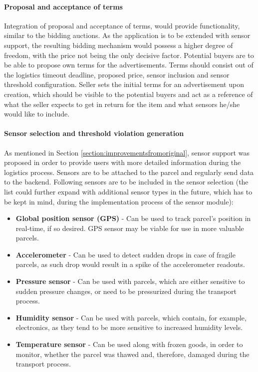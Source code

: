 \paragraph{Proposal and acceptance of terms}
Integration of proposal and acceptance of terms, would provide functionality, similar to the bidding auctions. As the application is to be extended with sensor support, the resulting bidding mechanism would possess a higher degree of freedom, with the price not being the only decisive factor. Potential buyers are to be able to propose own terms for the advertisements. Terms should consist out of the logistics timeout deadline, proposed price, sensor inclusion and sensor threshold configuration. Seller sets the initial terms for an advertisement upon creation, which should be visible to the potential buyers and act as a reference of what the seller expects to get in return for the item and what sensors he/she would like to include.

\paragraph{Sensor selection and threshold violation generation}
As mentioned in Section \ref{section:improvementsfromoriginal}, sensor support was proposed in order to provide users with more detailed information during the logistics process. Sensors are to be attached to the parcel and regularly send data to the backend. Following sensors are to be included in the sensor selection (the list could further expand with additional sensor types in the future, which has to be kept in mind, during the implementation process of the sensor module):

\begin{itemize}
\item \textbf{Global position sensor (GPS)} - Can be used to track parcel's position in real-time, if so desired. GPS sensor may be viable for use in more valuable parcels.
\item \textbf{Accelerometer} - Can be used to detect sudden drops in case of fragile parcels, as such drop would result in a spike of the accelerometer readouts.
\item \textbf{Pressure sensor} - Can be used with parcels, which are either sensitive to sudden pressure changes, or need to be pressurized during the transport process.
\item \textbf{Humidity sensor} - Can be used with parcels, which contain, for example, electronics, as they tend to be more sensitive to increased humidity levels.
\item \textbf{Temperature sensor} - Can be used along with frozen goods, in order to monitor, whether the parcel was thawed and, therefore, damaged during the transport process.
\end{itemize}

